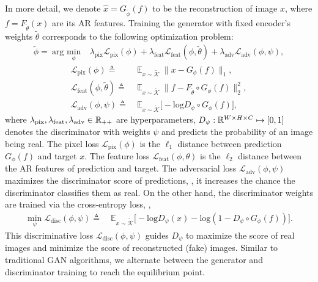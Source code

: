 In more detail, we denote $\hat{x}=G_{\tilde{\phi}}(f)$ to be the reconstruction of image $x$, where $f=F_{\tilde{\theta}}(x)$ are its AR features. Training the generator with fixed encoder's weights $\tilde{\theta}$  corresponds to the following optimization problem:
\begin{align}
    \tilde{\phi}=\ \text{arg }\underset{\phi}{\text{min}}&\ \lambda_{\text{pix}}\mathcal{L}_{\text{pix}}(\phi)+\lambda_{\text{feat}}\mathcal{L}_{\text{feat}}(\phi, \tilde{\theta}) + \lambda_{\text{adv}}\mathcal{L}_{\text{adv}}(\phi,\psi),
\end{align}
\vspace{-1.5\baselineskip}
\begin{align}
    \mathcal{L}_{\text{pix}}(\phi)\triangleq& \ \mathbb{E}_{x\sim \tilde{\mathcal{K}}}\ \|x-G_{\phi}(f)\|_{1},\\
    \mathcal{L}_{\text{feat}}(\phi, \tilde{\theta})\triangleq& \ \mathbb{E}_{x\sim \tilde{\mathcal{K}}}\ \|f-F_{\tilde{\theta}}\circ G_{\phi}(f)\|_{2}^{2},\\
    \mathcal{L}_{\text{adv}}(\phi, \psi)\triangleq&\ \mathbb{E}_{x\sim \tilde{\mathcal{K}}}\big[-\text{log}D_{\psi}\circ G_{\phi}(f)\big],
\end{align}
where $\lambda_{\text{pix}}, \lambda_{\text{feat}}, \lambda_{\text{adv}}\in \mathbb{R}_{++}$ are hyperparameters,  $D_{\psi}: \mathbb{R}^{W \times H \times C}\mapsto [0,1]$ denotes the discriminator with weights $\psi$ and predicts the probability of an image being real.
The pixel loss $\mathcal{L}_{\text{pix}}(\phi)$ is the $\ell_{1}$ distance between prediction $G_{\phi}(f)$ and target $x$. The feature loss $\mathcal{L}_{\text{feat}}(\phi, \theta)$ is the $\ell_{2}$ distance between the AR features of prediction and target. The adversarial loss $\mathcal{L}_{\text{adv}}(\phi, \psi)$ maximizes the discriminator score of predictions, \ie, it increases the chance the discriminator classifies them as real. On the other hand, the discriminator weights are trained via the cross-entropy loss, \ie, 
\begin{align}
 \min_\psi \mathcal{L}_{\text{disc}}(\phi, \psi)\triangleq&\ \mathbb{E}_{x\sim \tilde{\mathcal{K}}}\big[-\text{log}D_{\psi}(x)-\text{log}(1-D_{\psi}\circ G_{\phi}(f))\big].
\end{align}
This discriminative loss $ \mathcal{L}_{\text{disc}}(\phi, \psi)$ guides $D_\psi$ to maximize the score of real images and minimize the score of reconstructed (fake) images. Similar to traditional GAN algorithms, we alternate between the generator and discriminator training to reach the equilibrium point.

